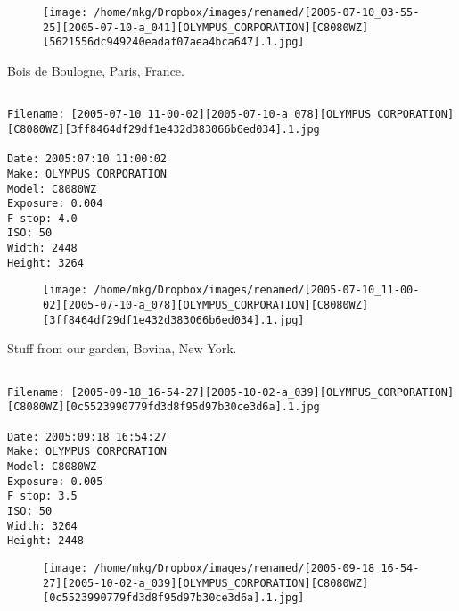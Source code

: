 \begin{figure}
\texttt{[image: /home/mkg/Dropbox/images/renamed/[2005-07-10\_03-55-25][2005-07-10-a\_041][OLYMPUS\_CORPORATION][C8080WZ][5621556dc949240eadaf07aea4bca647].1.jpg]}
\end{figure}
    
\clearpage
\onecolumn
\noindent Bois de Boulogne, Paris, France.
\noindent
\begin{lstlisting}

Filename: [2005-07-10_11-00-02][2005-07-10-a_078][OLYMPUS_CORPORATION][C8080WZ][3ff8464df29df1e432d383066b6ed034].1.jpg

Date: 2005:07:10 11:00:02
Make: OLYMPUS CORPORATION
Model: C8080WZ
Exposure: 0.004
F stop: 4.0
ISO: 50
Width: 2448
Height: 3264
\end{lstlisting}
\clearpage

\begin{figure}
\texttt{[image: /home/mkg/Dropbox/images/renamed/[2005-07-10\_11-00-02][2005-07-10-a\_078][OLYMPUS\_CORPORATION][C8080WZ][3ff8464df29df1e432d383066b6ed034].1.jpg]}
\end{figure}
    
\clearpage
\onecolumn
\noindent Stuff from our garden, Bovina, New York.
\noindent
\begin{lstlisting}

Filename: [2005-09-18_16-54-27][2005-10-02-a_039][OLYMPUS_CORPORATION][C8080WZ][0c5523990779fd3d8f95d97b30ce3d6a].1.jpg

Date: 2005:09:18 16:54:27
Make: OLYMPUS CORPORATION
Model: C8080WZ
Exposure: 0.005
F stop: 3.5
ISO: 50
Width: 3264
Height: 2448
\end{lstlisting}
\clearpage

\begin{figure}
\texttt{[image: /home/mkg/Dropbox/images/renamed/[2005-09-18\_16-54-27][2005-10-02-a\_039][OLYMPUS\_CORPORATION][C8080WZ][0c5523990779fd3d8f95d97b30ce3d6a].1.jpg]}
\end{figure}
    
